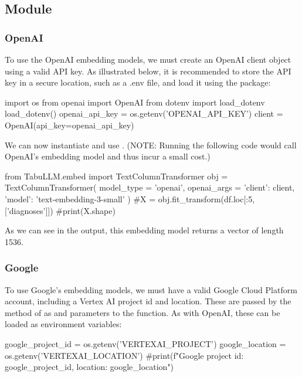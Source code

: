 \documentclass[article]{jss}
\begin{document}
\subsection[embed Module]{ Module}\label{subsec:using-embed}

\subsubsection{OpenAI}\label{subsubsec:using-embed-openai}

To use the OpenAI embedding models, we must create an OpenAI client object using a valid API key. As illustrated below, it is recommended to store the API key in a secure location, such as a .env file, and load it using the  package:
\begin{pyblock}
import os
from openai import OpenAI
from dotenv import load_dotenv
load_dotenv()
openai_api_key = os.getenv('OPENAI_API_KEY')
client = OpenAI(api_key=openai_api_key)
\end{pyblock}
We can now instantiate and use . (NOTE: Running the following code would call OpenAI's embedding model and thus incur a small cost.)
\begin{pyblock}
from TabuLLM.embed import TextColumnTransformer
obj = TextColumnTransformer(
  model_type = 'openai',
  openai_args = {
    'client': client, 
    'model': 'text-embedding-3-small'
  }
)
#X = obj.fit_transform(df.loc[:5, ['diagnoses']])
#print(X.shape)
\end{pyblock}

As we can see in the output, this embedding model returns a vector of length 1536.

\subsubsection{Google}\label{subsubsec:using-embed-google}

To use Google's embedding models, we must have a valid Google Cloud Platform account, including a Vertex AI project id and location. These are passed by the  method of  as  and  parameters to the  function. As with OpenAI, these can be loaded as environment variables:
\begin{pyblock}
google_project_id = os.getenv('VERTEXAI_PROJECT')
google_location = os.getenv('VERTEXAI_LOCATION')
#print(f"Google project id: {google_project_id}, location: {google_location}")
\end{pyblock}
\end{document}
